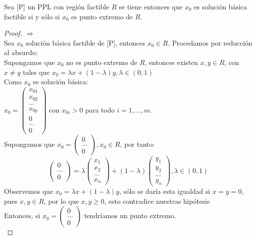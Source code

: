 \documentclass[11pt,fleqn]{book} %
\begin{document}
\begin{theorem}
  Sea [P] un PPL con región factible $R$ se tiene entonces que $x_0$ es solución básica factible si y sólo si $x_0$ es punto extremo de $R$.
\end{theorem}
\begin{proof}
  $\Rightarrow$ \\
  Sea $x_0$ solución básica factible de [P], entonces $x_0 \in R$. Procedamos por reducción al absurdo: \\
  Supongamos que $x_0$ no es punto extremo de $R$, entonces existen $x, y \in R$, con $x \neq y$ tales que $x_0 = \lambda x + (1-\lambda)y, \lambda \in (0, 1)$ \\
  Como $x_0$ es solución básica: \\
  $x_0=\left(\begin{array}{c}
	x_{01} \\
	x_{02} \\
	... \\
	x_{0p} \\
	0 \\
	... \\
	0
  \end{array}\right)$ con $x_{0i} > 0$ para todo $i=1,...,m$. \\
  Supongamos que	$x_0=\left(\begin{array}{c}
	0 \\
	... \\
	0
  \end{array}\right), x_0 \in R$, por tanto: 
  $$
  \left(\begin{array}{c}
	0 \\
	... \\
	0
  \end{array}\right)=\lambda \left(\begin{array}{c}
	x_1 \\
	x_2 \\
	... \\
	x_n
  \end{array}\right)+(1-\lambda)\left(\begin{array}{c}
	y_1 \\
	y_2 \\
	... \\
	y_n
  \end{array}\right), \lambda \in (0, 1)
  $$
  Observemos que $x_0=\lambda x + (1-\lambda )y$, sólo se daría esta igualdad si $x=y=0$, pues $x, y \in R$, por lo que $x, y \geq 0$, esto contradice nuestras hipótesis \\
  Entonces, si $x_0=\left(\begin{array}{c}
	0 \\
	... \\
	0
  \end{array}\right)$ tendríamos un punto extremo. \\
  

\end{proof}
\end{document}
